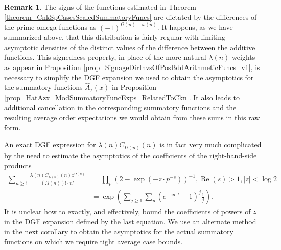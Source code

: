 \documentclass[11pt,reqno,a4letter]{article}
\numberwithin{figure}{section}
\numberwithin{table}{section}
\theoremstyle{plain}
\numberwithin{theorem}{section}
\theoremstyle{definition}
\newtheorem{remark}[theorem]{Remark}
\renewcommand{\Re}{\operatorname{Re}}
\begin{document}
\begin{remark}
The signs of the functions estimated in 
Theorem \ref{theorem_CnkSpCasesScaledSummatoryFuncs} are 
dictated by the differences of the prime omega functions as 
$(-1)^{\Omega(n) - \omega(n)}$. It happens, as we have summarized above, that 
this distribution is fairly regular with limiting asymptotic densities of the distinct values 
of the difference between the additive functions. This signedness property, in place of 
the more natural $\lambda(n)$ weights as appear in 
Proposition \ref{prop_SignageDirInvsOfPosBddArithmeticFuncs_v1}, is necessary to 
simplify the DGF expansion we used to obtain the asymptotics for the summatory 
functions $\widehat{A}_z(x)$ in 
Proposition \ref{prop_HatAzx_ModSummatoryFuncExps_RelatedToCkn}. It also leads to additional 
cancellation in the corresponding summatory functions and the resulting average order 
expectations we would obtain from these sums in this raw form. 

An exact DGF expression for 
$\lambda(n) C_{\Omega(n)}(n)$ is in fact very much complicated by the need to estimate the asymptotics 
of the coefficients of the right-hand-side products 
\begin{align*} 
\sum_{n \geq 1} \frac{\lambda(n) C_{\Omega(n)}(n) z^{\Omega(n)}}{(\Omega(n))! \cdot n^s} & = 
     \prod_p \left(2 - \exp\left(-z \cdot p^{-s}\right)\right)^{-1}, 
     \Re(s) > 1, |z| < \log 2 \\ 
     & = \exp\left(\sum_{j \geq 1} \sum_p \left(e^{-zp^{-s}}-1\right)^{j} \frac{1}{j}\right). 
\end{align*} 
It is unclear how to exactly, and effectively, bound the 
coefficients of powers of $z$ in the DGF expansion defined by the last equation. 
We use an alternate method in the next corollary to obtain the asymptotics for the actual 
summatory functions on which we require tight average case bounds. 
\end{remark} 
\end{document}
